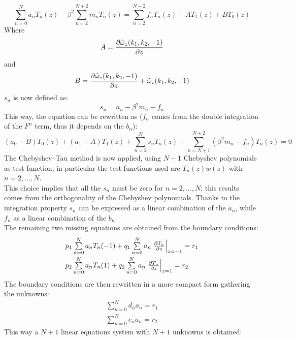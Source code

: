 \[
\sum_{n=0}^N a_n T_n(z)-\beta^2\sum_{n=2}^{N+2} m_nT_n(z)=\sum_{n=2}^{N+2} f_n T_n(z) +AT_1(z)+BT_0(z)
\]
Where 
\[
A=\frac{\partial\hat\omega_z(k_1,k_2,-1)}{\partial z}
\]
and
\[
B=\frac{\partial\hat\omega_z(k_1,k_2,-1)}{\partial z}+\hat\omega_z(k_1,k_2,-1)
\]
$s_n$ is now defined as:
\[
s_n=a_n-\beta^2m_n-f_n
\]
This way, the equation can be rewritten as ($f_n$ comes from the double integration of the $F^n$ term, thus it depends on the $b_n$):
\[
(a_0-B)T_0(z)+(a_1-A)T_1(z)+\sum_{n=2}^N s_n T_n(z)-\sum_{n=N+1}^{N+2}\left( \beta^2m_n -f_n \right)T_n(z)=0
\]
The Chebyshev--Tau method is now applied, using $N-1$ Chebyshev polynomials as test function; in particular the test functions used are $T_n(z)w(z)$ with $n=2,...,N$.\\
This choice implies that all the $s_n$ must be zero for $n=2,...,N$; this results comes from the orthogonality of the Chebyshev polynomials. Thanks to the integration property $s_n$ can be expressed as a linear combination of the $a_n$, while $f_n$ as a linear combination of the $b_n$.\\
The remaining two missing equations are obtained from the boundary conditions:
\[
\begin{array}{l}
p_1\sum\limits_{n=0}^N a_n T_n(-1)+q_1\sum\limits_{n=0}^N a_n\left.\frac{\partial T_n}{\partial z}\right|_{z=-1}=r_1\\[2ex]
p_2\sum\limits_{n=0}^N a_n T_n(1)+q_2\sum\limits_{n=0}^N a_n\left.\frac{\partial T_n}{\partial z}\right|_{z=1}=r_2\\
\end{array}
\]
The boundary conditions are then rewritten in a more compact form gathering the unknowns:
\[
\begin{array}{l}
\sum\limits_{n=0}^N d_n a_n=r_1\\[2ex]
\sum\limits_{n=0}^N e_n a_n=r_2
\end{array}
\]
This way a $N+1$ linear equations system with $N+1$ unknowns is obtained:
